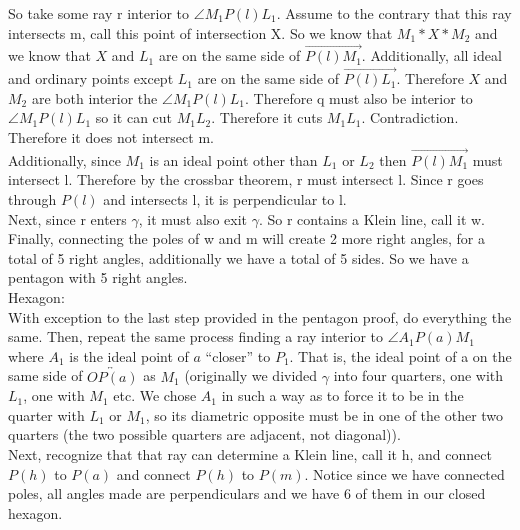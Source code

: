 \documentclass[12pt,letterpaper]{article}
\begin{document}
So take some ray r interior to $\angle M_1P(l)L_1$. Assume to the contrary that this ray intersects m, call this point of intersection X.  So we know that $M_1*X*M_2$ and we know that $X$ and $L_1$ are on the same side of $\overrightarrow{P(l)M_1}$. Additionally, all ideal and ordinary points except $L_1$ are on the same side of $\overrightarrow{P(l)L_1}$. Therefore $X$ and $M_2$ are both interior the $\angle M_1P(l)L_1$. Therefore q must also be interior to $\angle M_1 P(l)L_1$ so it can cut $M_1L_2$.  Therefore it cuts $M_1L_1$. Contradiction.  Therefore it does not intersect m.\\

Additionally, since $M_1$ is an ideal point other than $L_1$ or $L_2$ then $\overrightarrow{P(l)M_1}$ must intersect l.  Therefore by the crossbar theorem, r must intersect l. Since r goes through $P(l)$ and intersects l, it is perpendicular to l. \\

Next, since r enters $\gamma$, it must also exit $\gamma$.  So r contains a Klein line, call it w.\\



Finally, connecting the poles of w and m will create 2 more right angles, for a total of 5 right angles, additionally we have a total of 5 sides.  So we have a pentagon with 5 right angles. \\ 
  

\noindent Hexagon:\\

With exception to the last step provided in the pentagon proof, do everything the same.  Then, repeat the same process finding a ray interior to $\angle A_1P(a)M_1$ where $A_1$ is the ideal point of $a$ ``closer'' to $P_1$.  That is, the ideal point of a on the same side of $\overleftrightarrow{OP(a)}$ as $M_1$ (originally we divided $\gamma$ into four quarters, one with $L_1$, one with $M_1$ etc.  We chose $A_1$ in such a way as to force it to be in the quarter with $L_1$ or $M_1$, so its diametric opposite must be in one of the other two quarters (the two possible quarters are adjacent, not diagonal)).\\

Next, recognize that that ray can determine a Klein line, call it h, and connect $P(h)$ to $P(a)$ and connect $P(h)$ to $P(m)$.  Notice since we have connected poles, all angles made are perpendiculars and we have 6 of them in our closed hexagon. 
\end{document}

